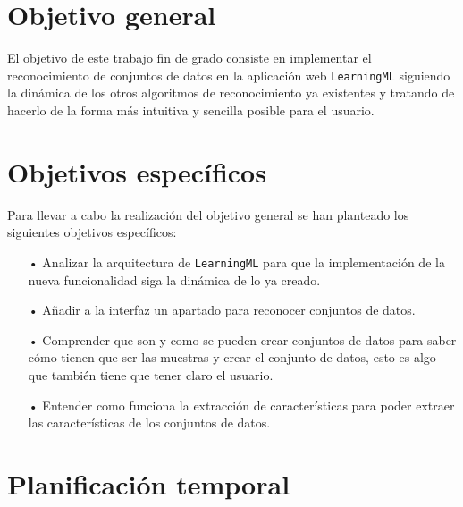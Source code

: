 \documentclass[a4paper, 12pt]{book}
\begin{document}
\section{Objetivo general} %
\label{sec:objetivo-general} %

El objetivo de este trabajo fin de grado consiste en implementar el reconocimiento de conjuntos de datos en la aplicación web \texttt{LearningML} siguiendo la dinámica de los otros algoritmos de reconocimiento ya existentes y tratando de hacerlo de la forma más intuitiva y sencilla posible para el usuario.


\section{Objetivos específicos}
\label{sec:objetivos-especificos}

Para llevar a cabo la realización del objetivo general se han planteado los siguientes objetivos específicos:

\begin{itemize}

\item[•] Analizar la arquitectura de \texttt{LearningML} para que la implementación de la nueva funcionalidad siga la dinámica de lo ya creado.

\item[•] Añadir a la interfaz un apartado para reconocer conjuntos de datos.

\item[•] Comprender que son y como se pueden crear conjuntos de datos para saber cómo tienen que ser las muestras y crear el conjunto de datos, esto es algo que también tiene que tener claro el usuario.

\item[•] Entender como funciona la extracción de características para poder extraer las características de los conjuntos de datos.

\end{itemize}

\section{Planificación temporal}

\label{sec:planificacion-temporal}
\end{document}
